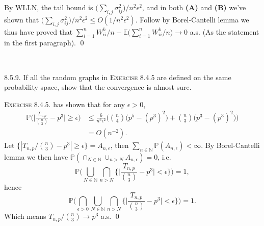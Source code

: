 \begin{answer}
By WLLN, the tail bound is $\big(\sum_{i,j}\sigma_{ij}^2\big)/n^2\epsilon^2$, and in both \textbf{(A)} and \textbf{(B)} we've shown that $\big(\sum_{i,j}\sigma_{ij}^2\big)/n^2\epsilon^2\leq O(1/n^2\epsilon^2)$. Follow by Borel-Cantelli lemma we thus have proved that $\sum_{i=1}^nW_{ii}^k/n-\mathbb{E}\big(\sum_{i=1}^nW^k_{ii}/n\big)\rightarrow 0$ a.s. (As the statement in the first paragraph).
\qed\qquad
\end{answer}\\

\begin{exercise}8.5.9. If all the random graphs in \textsc{Exercise} 8.4.5 are defined on the
same probability space, show that the convergence is almost sure.
\end{exercise}
\begin{answer} \textsc{Exercise 8.4.5.} has shown that for any $\epsilon>0$,
\begin{equation*}
\begin{aligned}
    \mathbb{P}\Big(\Big|\frac{T_{n,p}}{\binom{n}{3}}-p^3\Big|\geq\epsilon\Big)&\leq\frac{6}{n^6\epsilon^2}\Big(\binom{n}{4}\big(p^5-(p^3)^2\big)+\binom{n}{3}\big(p^3-(p^3)^2\big)\Big)\\&
    =O(n^{-2}).
\end{aligned}
\end{equation*}
Let $\{|T_{n,p}/\binom{n}{3}-p^3|\geq\epsilon\}=A_{n,\epsilon}$, then $\sum_{n\in\mathbb{N}}\mathbb{P}(A_{n,\epsilon})<\infty$. By Borel-Cantelli lemma we then have $\mathbb{P}(\cap_{N\in\mathbb{N}}\cup_{n>N}A_{n,\epsilon})=0$, i.e.
\begin{equation*}
    \mathbb{P}\Big(\bigcup_{N\in\mathbb{N}}\bigcap_{n>N}\Big\{\Big|\frac{T_{n,p}}{\binom{n}{3}}-p^3\Big|<\epsilon\Big\}\Big)=1,
\end{equation*}
hence
\begin{equation*}
    \mathbb{P}\Big(\bigcap_{\epsilon>0}\bigcup_{N\in\mathbb{N}}\bigcap_{n>N}\Big\{\Big|\frac{T_{n,p}}{\binom{n}{3}}-p^3\Big|<\epsilon\Big\}\Big)=1.
\end{equation*}
Which means $T_{n,p}/\binom{n}{3}\rightarrow p^3$ a.s.
\qed\qquad
\end{answer}\\ \\

